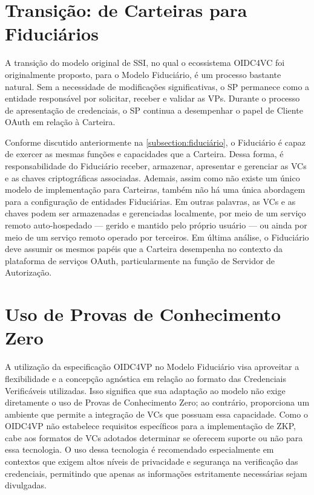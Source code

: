 \section{Transição: de Carteiras para Fiduciários}

A transição do modelo original de \acs{SSI}, no qual o ecossistema \acs{OIDC4VC} foi originalmente proposto, para o Modelo Fiduciário, é um processo bastante natural. Sem a necessidade de modificações significativas, o \acs{SP} permanece como a entidade responsável por solicitar, receber e validar as \acs{VP}s. Durante o processo de apresentação de credenciais, o \acs{SP} continua a desempenhar o papel de Cliente OAuth em relação à Carteira.

Conforme discutido anteriormente na \autoref{subsection:fiduciário}, o Fiduciário é capaz de exercer as mesmas funções e capacidades que a Carteira. Dessa forma, é responsabilidade do Fiduciário receber, armazenar, apresentar e gerenciar as \acs{VC}s e as chaves criptográficas associadas. Ademais, assim como não existe um único modelo de implementação para Carteiras, também não há uma única abordagem para a configuração de entidades Fiduciárias. Em outras palavras, as \acs{VC}s e as chaves podem ser armazenadas e gerenciadas localmente, por meio de um serviço remoto auto-hospedado — gerido e mantido pelo próprio usuário — ou ainda por meio de um serviço remoto operado por terceiros. Em última análise, o Fiduciário deve assumir os mesmos papéis que a Carteira desempenha no contexto da plataforma de serviços OAuth, particularmente na função de Servidor de Autorização.



\section{Uso de Provas de Conhecimento Zero}

A utilização da especificação OIDC4VP no Modelo Fiduciário visa aproveitar a flexibilidade e a concepção agnóstica em relação ao formato das Credenciais Verificáveis utilizadas. Isso significa que sua adaptação ao modelo não exige diretamente o uso de Provas de Conhecimento Zero; ao contrário, proporciona um ambiente que permite a integração de \acs{VC}s que possuam essa capacidade. Como o \acs{OIDC4VP} não estabelece requisitos específicos para a implementação de \acs{ZKP}, cabe aos formatos de \acs{VC}s adotados determinar se oferecem suporte ou não para essa tecnologia. O uso dessa tecnologia é recomendado especialmente em contextos que exigem altos níveis de privacidade e segurança na verificação das credenciais, permitindo que apenas as informações estritamente necessárias sejam divulgadas.

